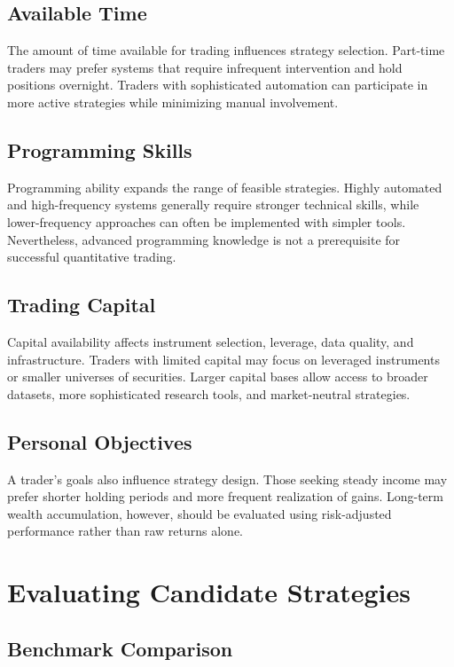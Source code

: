 \documentclass[11pt]{article}
\begin{document}
\subsection{Available Time}

The amount of time available for trading influences strategy selection. Part-time traders may prefer systems that require infrequent intervention and hold positions overnight. Traders with sophisticated automation can participate in more active strategies while minimizing manual involvement.

\subsection{Programming Skills}

Programming ability expands the range of feasible strategies. Highly automated and high-frequency systems generally require stronger technical skills, while lower-frequency approaches can often be implemented with simpler tools. Nevertheless, advanced programming knowledge is not a prerequisite for successful quantitative trading.

\subsection{Trading Capital}

Capital availability affects instrument selection, leverage, data quality, and infrastructure. Traders with limited capital may focus on leveraged instruments or smaller universes of securities. Larger capital bases allow access to broader datasets, more sophisticated research tools, and market-neutral strategies.

\subsection{Personal Objectives}

A trader's goals also influence strategy design. Those seeking steady income may prefer shorter holding periods and more frequent realization of gains. Long-term wealth accumulation, however, should be evaluated using risk-adjusted performance rather than raw returns alone.

\section{Evaluating Candidate Strategies}

\subsection{Benchmark Comparison}
\end{document}
